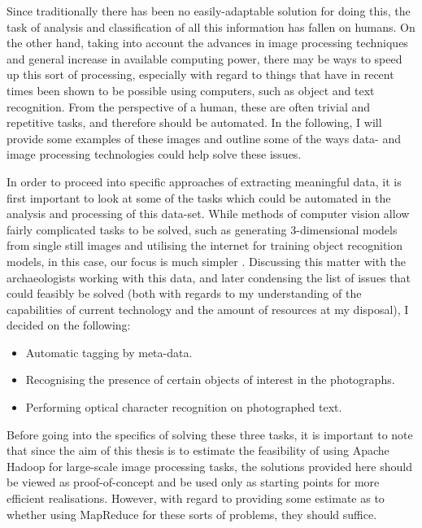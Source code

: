 \documentclass [12pt,a4paper]{report}
\begin{document}
Since traditionally there has been no easily-adaptable solution for doing this, the task of analysis and classification of all this information has fallen on humans. On the other hand, taking into account the advances in image processing techniques and general increase in available computing power, there may be ways to speed up this sort of processing, especially with regard to things that have in recent times been shown to be possible using computers, such as object and text recognition. From the perspective of a human, these are often trivial and repetitive tasks, and therefore should be automated. In the following, I will provide some examples of these images and outline some of the ways data- and image processing technologies could help solve these issues.

In order to proceed into specific approaches of extracting meaningful data, it is first important to look at some of the tasks which could be automated in the analysis and processing of this data-set. While methods of computer vision allow fairly complicated tasks to be solved, such as generating 3-dimensional models from single still images and utilising the internet for training object recognition models, in this case, our focus is much simpler \cite{sudo2009associative,saxena2008}. Discussing this matter with the archaeologists working with this data, and later condensing the list of issues that could feasibly be solved (both with regards to my understanding of the capabilities of current technology and the amount of resources at my disposal), I decided on the following:

\begin{itemize} 
\item Automatic tagging by meta-data.
\item Recognising the presence of certain objects of interest in the photographs.
\item Performing optical character recognition on photographed text.
\end{itemize} 

Before going into the specifics of solving these three tasks, it is important to note that since the aim of this thesis is to estimate the feasibility of using Apache Hadoop for large-scale image processing tasks, the solutions provided here should be viewed as proof-of-concept and be used only as starting points for more efficient realisations. However, with regard to providing some estimate as to whether using MapReduce for these sorts of problems, they should suffice.
\end{document}
